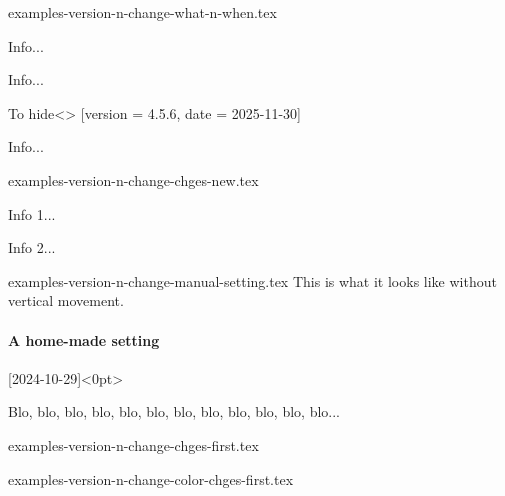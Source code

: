 \begin{filecontents*}[overwrite]{examples-version-n-change-what-n-when.tex}
\begin{tdoctech}[date      = 2024-10-29,
                 col-chges = red]
    \item Info...
\end{tdoctech}

\begin{tdocupdate}[version   = 1.2.3,
                   col-chges = ForestGreen,
                   col       = ForestGreen]
    \item Info...
\end{tdocupdate}

\begin{tdoctopic}{To hide}<\faEyeSlash>%
                 [version = 4.5.6,
                  date    = 2025-11-30]
    \item Info...
\end{tdoctopic}
\end{filecontents*}


\begin{filecontents*}[overwrite]{examples-version-n-change-chges-new.tex}
\begin{tdocnew}
    \item Info 1...
    \item Info 2...
\end{tdocnew}
\end{filecontents*}


\begin{filecontents*}[overwrite]{examples-version-n-change-manual-setting.tex}
This is what it looks like without vertical movement.

\paragraph{A home-made setting}%
[2024-10-29]<0pt>

Blo, blo, blo, blo, blo, blo, blo, blo, blo, blo, blo, blo...
\end{filecontents*}


\begin{filecontents*}[overwrite]{examples-version-n-change-chges-first.tex}
\end{filecontents*}


\begin{filecontents*}[overwrite]{examples-version-n-change-color-chges-first.tex}
\end{filecontents*}


